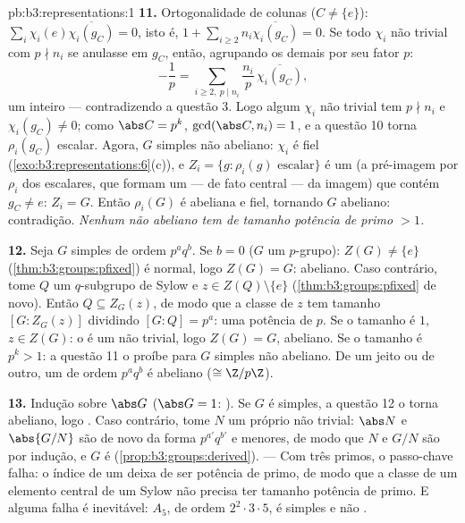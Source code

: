\begin{solution}{pb:b3:representations:1}
\textbf{11.} Ortogonalidade de colunas ($C \neq \{e\}$):
$\sum_i \chi_i(e)\overline{\chi_i(g_C)} = 0$, isto é, $1 +
\sum_{i \geq 2} n_i\overline{\chi_i(g_C)} = 0$. Se todo
$\chi_i$ não trivial com $p \nmid n_i$ se anulasse em $g_C$, então,
agrupando os demais por seu fator $p$:
\[
-\frac1p = \sum_{i \geq 2,\ p \mid n_i}
\frac{n_i}{p}\,\overline{\chi_i(g_C)},
\]
um inteiro  --- contradizendo a questão 3. Logo algum
$\chi_i$ não trivial tem $p \nmid n_i$ e $\chi_i(g_C) \neq 0$;
como $\abs C = p^k$, $\gcd(\abs C, n_i) = 1$, e a questão 10
torna $\rho_i(g_C)$ escalar. Agora, $G$ simples não abeliano:
$\chi_i$ é fiel (\cref{exo:b3:representations:6}(c)), e
$Z_i = \{g : \rho_i(g) \text{ escalar}\}$ é um 
(a pré-imagem por $\rho_i$ dos escalares, que formam um  --- de fato central --- da imagem) que contém
$g_C \neq e$: $Z_i = G$. Então $\rho_i(G)$ é abeliana e
fiel, tornando $G$ abeliano: contradição. \emph{Nenhum 
não abeliano tem  de tamanho potência de primo
$> 1$.}

\textbf{12.} Seja $G$ simples de ordem $p^aq^b$. Se $b = 0$
($G$ um $p$-grupo): $Z(G) \neq \{e\}$
(\cref{thm:b3:groups:pfixed}) é normal, logo $Z(G) = G$: abeliano.
Caso contrário, tome $Q$ um $q$-subgrupo de Sylow e $z \in Z(Q)
\setminus\{e\}$ (\cref{thm:b3:groups:pfixed} de novo). Então $Q
\subseteq Z_G(z)$, de modo que a classe de $z$ tem tamanho $[G : Z_G(z)]$
dividindo $[G : Q] = p^a$: uma potência de $p$. Se o tamanho é $1$,
$z \in Z(G)$: o  é um  não trivial, logo
$Z(G) = G$, abeliano. Se o tamanho é $p^k > 1$: a questão 11
o proíbe para $G$ simples não abeliano. De um jeito ou de outro, um 
de ordem $p^aq^b$ é abeliano ($\cong \Z/p\Z$).

\textbf{13.} Indução sobre $\abs G$ ($\abs G = 1$: ). Se
$G$ é simples, a questão 12 o torna abeliano, logo .
Caso contrário, tome $N$ um  próprio não trivial: $\abs
N$ e $\abs{G/N}$ são de novo da forma $p^{a'}q^{b'}$ e
menores, de modo que $N$ e $G/N$ são  por indução, e $G$ é
 (\cref{prop:b3:groups:derived}). --- Com três
primos, o passo-chave falha: o índice de um  deixa de
ser potência de primo, de modo que a classe de um elemento central de um
Sylow não precisa ter tamanho potência de primo. E alguma falha é
inevitável: $A_5$, de ordem $2^2\cdot3\cdot5$, é simples e
não .


\end{solution}
